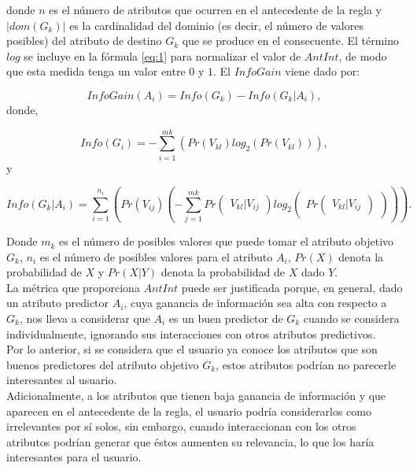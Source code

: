 \noindent
donde $n$ es el número de atributos que ocurren en el antecedente de la regla y $|dom(G_k)|$ es la cardinalidad del dominio (es decir, el número de valores posibles) del atributo de destino $G_k$ que se produce en el consecuente. El término $log$ se incluye en la fórmula \ref{eq:1} para normalizar el valor de $AntInt$, de modo que esta medida tenga un valor entre $0$ y $1$. El $InfoGain$ viene dado por:

\begin{equation} \label{eq:2}
InfoGain(A_i)=Info(G_k)-Info(\left.G_k\right| A_i),
\end{equation}
donde,

\begin{equation}  \label{eq:3}
Info(G_i)=-\sum\limits_{i=1}^{mk}\left(Pr(V_{kl}) log_2 (Pr(V_{kl}))\right),
\end{equation}
y

\begin{equation} \label{eq:4}
Info(\left. G_k \right| A_i)=\sum\limits_{i=1}^{n_i}\left( Pr(V_{ij})\left(-\sum\limits_{j=1}^{mk} Pr\begin{pmatrix}V_{kl}|V_{ij}\end{pmatrix} log_2 \begin{pmatrix}Pr\begin{pmatrix}V_{kl}|V_{ij}\end{pmatrix}\end{pmatrix}\right)  \right).
\end{equation}


Donde $m_k$ es el número de posibles valores que puede tomar el atributo objetivo $G_k$, $n_i$ es el número de posibles valores para el atributo $A_i$, $Pr(X)$ denota la probabilidad de $X$ y $Pr(X|Y)$ denota la probabilidad de $X$ dado $Y$.
\\

La métrica que proporciona $AntInt$ puede ser justificada porque, en general, dado un atributo predictor $A_i$, cuya ganancia de información sea alta con respecto a $G_k$, nos lleva a considerar que $A_i$ es un buen predictor de $G_k$ cuando se considera individualmente, ignorando sus interacciones con otros atributos predictivos.
\\

Por lo anterior, si se considera que el usuario ya conoce los atributos que son buenos predictores del atributo objetivo $G_k$, estos atributos podrían no parecerle interesantes al usuario.
\\

Adicionalmente, a los atributos que tienen baja ganancia de información y que aparecen en el antecedente de la regla, el usuario podría considerarlos como irrelevantes por sí solos, sin embargo, cuando interaccionan con los otros atributos podrían generar que éstos aumenten su relevancia, lo que los haría interesantes para el usuario.
\\


